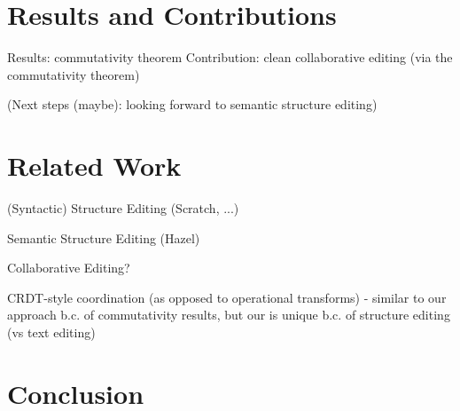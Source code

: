 \documentclass[nonacm, acmsmall, screen, review]{acmart}
\begin{document}









\section{Results and Contributions}

Results: commutativity theorem
Contribution: clean collaborative editing (via the commutativity theorem)

(Next steps (maybe): looking forward to semantic structure editing)

\section{Related Work}

(Syntactic) Structure Editing (Scratch, ...)

Semantic Structure Editing (Hazel)

Collaborative Editing?

CRDT-style coordination (as opposed to operational transforms)
- similar to our approach b.c. of commutativity results, but our is unique b.c. of structure editing (vs text editing)

\section{Conclusion}
\end{document}
